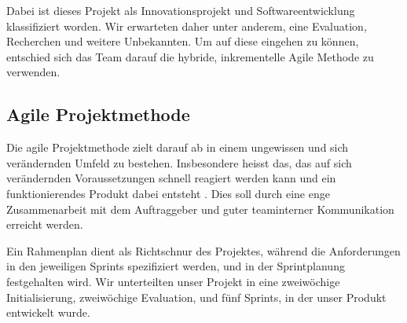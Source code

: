 \documentclass[a4paper]{scrreprt}
\begin{document}
Dabei ist dieses Projekt als Innovationsprojekt und Softwareentwicklung klassifiziert worden. Wir erwarteten daher unter anderem, eine Evaluation, Recherchen und weitere Unbekannten. Um auf diese eingehen zu können, entschied sich das Team darauf die hybride, inkrementelle Agile Methode zu verwenden.

\subsection{Agile Projektmethode}

Die agile Projektmethode zielt darauf ab in einem ungewissen und sich verändernden Umfeld zu bestehen. Insbesondere heisst das, das auf sich verändernden Voraussetzungen schnell reagiert werden kann und ein funktionierendes Produkt dabei entsteht \parencite{AgileAlliance2015}. Dies soll durch eine enge Zusammenarbeit mit dem Auftraggeber und guter teaminterner Kommunikation erreicht werden.

Ein Rahmenplan dient als Richtschnur des Projektes, während die Anforderungen in den jeweiligen Sprints spezifiziert werden, und in der Sprintplanung festgehalten wird. Wir unterteilten unser Projekt in eine zweiwöchige Initialisierung, zweiwöchige Evaluation, und fünf Sprints, in der unser Produkt entwickelt wurde.
\end{document}

